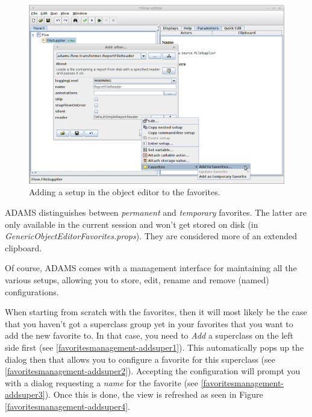 \begin{figure}[htb]
  \centering
  \includegraphics[width=12.0cm]{images/favorites-goe.png}
  \caption{Adding a setup in the object editor to the favorites.}
  \label{favorites-goe}
\end{figure}

ADAMS distinguishes between \textit{permanent} and \textit{temporary} favorites.
The latter are only available in the current session and won't get stored on 
disk (in \textit{GenericObjectEditorFavorites.props}). They are considered 
more of an extended clipboard.

Of course, ADAMS comes with a management interface for maintaining all the
various setups, allowing you to store, edit, rename and remove (named) 
configurations. 

\clearpage
{}
When starting from scratch with the favorites, then it will most likely be the
case that you haven't got a superclass group yet in your favorites that you want
to add the new favorite to. In that case, you need to \textit{Add} a superclass
on the left side first (see \ref{favoritesmanagement-addsuper1}). This
automatically pops up the dialog then that allows you to configure a favorite
for this superclass (see \ref{favoritesmanagement-addsuper2}). Accepting the
configuration will prompt you with a dialog requesting a \textit{name} for the
favorite (see \ref{favoritesmanagement-addsuper3}). Once this is done, the view
is refreshed as seen in Figure \ref{favoritesmanagement-addsuper4}.

